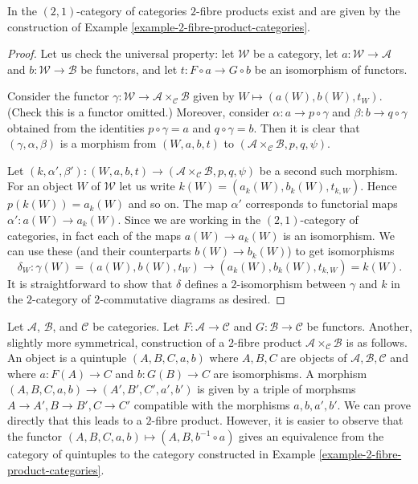\begin{lemma}
\label{lemma-2-fibre-product-categories}
In the $(2, 1)$-category of categories $2$-fibre products exist and
are given by the construction of
Example \ref{example-2-fibre-product-categories}.
\end{lemma}

\begin{proof}
Let us check the universal property:
let $\mathcal{W}$ be a category, let
$a : \mathcal{W} \to \mathcal{A}$ and
$b : \mathcal{W} \to \mathcal{B}$ be functors, and
let $t : F \circ a \to G \circ b$ be an isomorphism of functors.

\medskip\noindent
Consider the functor
$\gamma : \mathcal{W} \to \mathcal{A}\times_\mathcal{C}\mathcal{B}$
given by $W \mapsto (a(W), b(W), t_W)$.
(Check this is a functor omitted.)
Moreover, consider $\alpha : a \to p \circ \gamma$ and
$\beta : b \to q \circ \gamma$ obtained from the identities
$p \circ \gamma = a$ and $q \circ \gamma = b$. Then it is
clear that $(\gamma, \alpha, \beta)$ is a morphism
from $(W, a, b, t)$ to
$(\mathcal{A} \times_\mathcal{C} \mathcal{B}, p, q, \psi)$.

\medskip\noindent
Let
$(k, \alpha', \beta') :
(W, a, b, t) \to (\mathcal{A} \times_\mathcal{C} \mathcal{B}, p, q, \psi)$
be a second such morphism. For an object $W$ of $\mathcal{W}$ let us write
$k(W) = (a_k(W), b_k(W), t_{k, W})$. Hence $p(k(W)) = a_k(W)$ and so on.
The map $\alpha'$ corresponds to functorial maps
$\alpha' : a(W) \to a_k(W)$. Since we are working in the
$(2, 1)$-category of categories, in fact each of the maps
$a(W) \to a_k(W)$ is an isomorphism. We can use these
(and their counterparts $b(W) \to b_k(W)$) to get isomorphisms
$$
\delta_W :
\gamma(W) = (a(W), b(W), t_W)
\longrightarrow
(a_k(W), b_k(W), t_{k, W}) = k(W).
$$
It is straightforward to show that $\delta$ defines a 
$2$-isomorphism between $\gamma$ and $k$ in the $2$-category
of $2$-commutative diagrams as desired.
\end{proof}

\begin{remark}
\label{remark-other-description-2-fibre-product}
Let $\mathcal{A}$, $\mathcal{B}$, and $\mathcal{C}$ be categories.
Let $F : \mathcal{A} \to \mathcal{C}$ and $G : \mathcal{B} \to \mathcal{C}$
be functors. Another, slightly more symmetrical, construction of a $2$-fibre
product $\mathcal{A} \times_\mathcal{C} \mathcal{B}$ is as follows.
An object is a quintuple $(A, B, C, a, b)$ where $A, B, C$ are objects
of $\mathcal{A}, \mathcal{B}, \mathcal{C}$ and where $a : F(A) \to C$
and $b : G(B) \to C$ are isomorphisms. A morphism
$(A, B, C, a, b) \to (A', B', C', a', b')$ is given by a triple
of morphsms $A \to A', B \to B', C \to C'$ compatible with the morphisms
$a, b, a', b'$. We can prove directly that this leads to a $2$-fibre
product. However, it is easier to observe that the functor
$(A, B, C, a, b) \mapsto (A, B, b^{-1} \circ a)$ gives an equivalence
from the category of quintuples to the category constructed in
Example \ref{example-2-fibre-product-categories}.
\end{remark}

